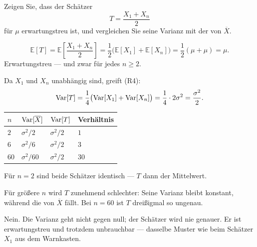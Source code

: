 \begin{aufgabe}
Zeigen Sie, dass der Schätzer
\[ T = \frac{X_1 + X_n}{2} \]
für $\mu$ erwartungstreu ist, und vergleichen Sie seine Varianz mit der von $\overline X$.

\loesung
{}
\[ \mathbb{E}[T] = \mathbb{E}\!\left[\frac{X_1+X_n}{2}\right] = \frac{1}{2}\bigl(\mathbb{E}[X_1] + \mathbb{E}[X_n]\bigr) = \frac{1}{2}(\mu+\mu) = \mu . \]
Erwartungstreu --- und zwar für jedes $n \ge 2$. \checkmark

Da $X_1$ und $X_n$ unabhängig sind, greift (R4):
\[ \operatorname{Var}[T] = \frac{1}{4}\bigl(\operatorname{Var}[X_1] + \operatorname{Var}[X_n]\bigr) = \frac{1}{4}\cdot 2\sigma^2 = \frac{\sigma^2}{2} . \]

\begin{center}
\renewcommand{\arraystretch}{1.48}
\begin{tabular}{@{}P{2.0cm}P{2.2cm}P{2.2cm}P{2.0cm}@{}}
\toprule
$n$ & $\operatorname{Var}[\overline X]$ & $\operatorname{Var}[T]$ & \textbf{Verhältnis}\\
\midrule
$2$ & $\sigma^2/2$ & $\sigma^2/2$ & $1$\\
$6$ & $\sigma^2/6$ & $\sigma^2/2$ & $3$\\
$60$ & $\sigma^2/60$ & $\sigma^2/2$ & $30$\\
\bottomrule
\end{tabular}
\end{center}

Für $n=2$ sind beide Schätzer identisch --- $T$  dann der Mittelwert.

Für größere $n$ wird $T$ zunehmend schlechter: Seine Varianz bleibt konstant, während die von $\overline X$ fällt. Bei $n=60$ ist $T$ dreißigmal so ungenau.

Nein. Die Varianz geht nicht gegen null; der Schätzer wird nie genauer. Er ist erwartungstreu und trotzdem unbrauchbar --- dasselbe Muster wie beim Schätzer $X_1$ aus dem Warnkasten.

\begin{center}
\begin{minipage}{0.86\textwidth}
\end{minipage}
\end{center}
\end{aufgabe}

